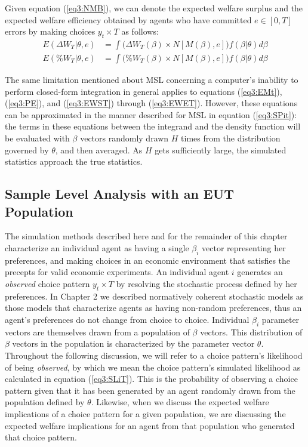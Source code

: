 \documentclass[../main.tex]{subfiles}
\begin{document}
Given equation (\ref{eq3:NMB}), we can denote the expected welfare surplus and the expected welfare efficiency obtained by agents who have committed $e \in [0,T]$ errors by making choices $y_t \times T$ as follows:
\begin{align}
	E( \Delta W_T | \theta, e) &= \int \bigr( \Delta W_T(\beta) \times N[M(\beta),e] \bigr) f(\beta | \theta) d \beta \label{eq3:EDWTe}\\
	E( \% W_T | \theta, e) &= \int \bigl( \% W_T(\beta) \times N[M(\beta),e] \bigr) f(\beta | \theta) d \beta \label{eq3:EPWTe}
\end{align}

The same limitation mentioned about MSL concerning a computer's inability to perform closed-form integration in general applies to equations (\ref{eq3:EMt}), (\ref{eq3:PE}), and (\ref{eq3:EWST}) through (\ref{eq3:EWET}).
However, these equations can be approximated in the manner described for MSL in equation (\ref{eq3:SPit}): the terms in these equations between the integrand and the density function will be evaluated with $\beta$ vectors randomly drawn $H$ times from the distribution governed by $\theta$, and then averaged.
As $H$ gets sufficiently large, the simulated statistics approach the true statistics.

\subsection{Sample Level Analysis with an EUT Population}

The simulation methods described here and for the remainder of this chapter characterize an individual agent as having a single $\beta_i$ vector representing her preferences, and making choices in an economic environment that satisfies the \textcite{Smith1982} precepts for valid economic experiments.
An individual agent $i$ generates an \textit{observed} choice pattern $y_t \times T$ by resolving the stochastic process defined by her preferences.
In Chapter 2 we described normatively coherent stochastic models as those models that characterize agents as having non-random preferences, thus an agent's preferences do not change from choice to choice.{\footnotemark}
Individual $\beta_i$ parameter vectors are themselves drawn from a population of $\beta$ vectors.
This distribution of $\beta$ vectors in the population is characterized by the parameter vector $\theta$.
Throughout the following discussion, we will refer to a choice pattern's likelihood of being \textit{observed}, by which we mean the choice pattern's simulated likelihood as calculated in equation (\ref{eq3:SLiT}).
This is the probability of observing a choice pattern given that it has been generated by an agent randomly drawn from the population defined by $\theta$.
Likewise, when we discuss the expected welfare implications of a choice pattern for a given population, we are discussing the expected welfare implications for an agent from that population who generated that choice pattern.
\end{document}

